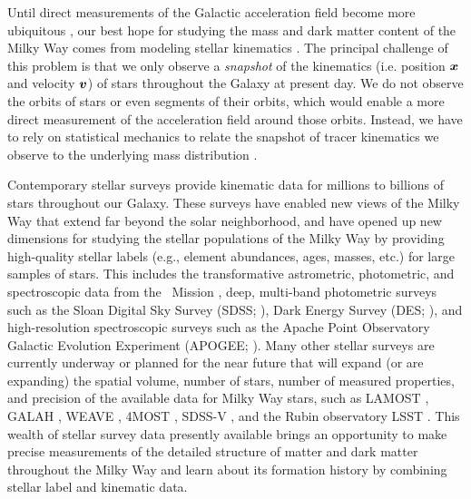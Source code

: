 \documentclass[modern]{aastex631}
\begin{document}
Until direct measurements of the Galactic acceleration field become more ubiquitous
\citep{Klioner:2021, Chakrabarti:2021}, our best hope for studying the mass and dark
matter content of the Milky Way comes from modeling stellar kinematics
\citep[e.g.,][]{Oort:1932, Binney:2008, Rix:2013}.
The principal challenge of this problem is that we only observe a \emph{snapshot} of the
kinematics (i.e. position $\boldsymbol{x}$ and velocity $\boldsymbol{v}$) of stars throughout the Galaxy
at present day.
We do not observe the orbits of stars or even segments of their orbits, which would
enable a more direct measurement of the acceleration field around those orbits.
Instead, we have to rely on statistical mechanics to relate the snapshot of tracer
kinematics we observe to the underlying mass distribution \citep[e.g.,][]{Kuijken:1989a,
Binney:2008, Magorrian:2014}.

Contemporary stellar surveys provide kinematic data for millions to billions of stars
throughout our Galaxy.
These surveys have enabled new views of the Milky Way that extend far beyond the solar
neighborhood, and have opened up new dimensions for studying the stellar populations of
the Milky Way by providing high-quality stellar labels (e.g., element abundances, ages,
masses, etc.) for large samples of stars.
This includes the transformative astrometric, photometric, and spectroscopic data from
the \gaia\ Mission \citep{Gaia:2016, Gaia:2023}, deep, multi-band photometric surveys
such as the Sloan Digital Sky Survey (SDSS; \citealt{York:2000}), Dark Energy Survey
(DES; \citealt{DES:2016}), and high-resolution spectroscopic surveys such as the Apache
Point Observatory Galactic Evolution Experiment (APOGEE; \citealt{APOGEE:2017}).
Many other stellar surveys are currently underway or planned for the near future that
will expand (or are expanding) the spatial volume, number of stars, number of measured
properties, and precision of the available data for Milky Way stars, such as LAMOST
\citep{LAMOST:2022}, GALAH \citep{DeSilva:2015, Buder:2022}, WEAVE \citep{WEAVE:2023},
4MOST \citep{deJong:2019}, SDSS-V \citep{Kollmeier:2017}, and the Rubin observatory LSST
\citep{LSST:2009}.
This wealth of stellar survey data presently available brings an opportunity to make
precise measurements of the detailed structure of matter and dark matter throughout the
Milky Way and learn about its formation history by combining stellar label and kinematic
data.
\end{document}
